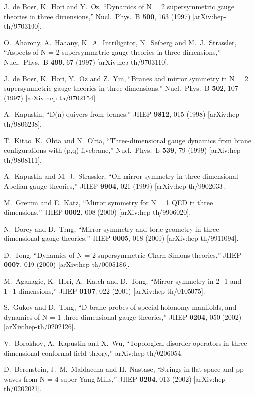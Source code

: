 \documentclass[a4paper,12pt, amsfonts, amssymb]{article}
\begin{document}
\begin{thebibliography}{99}
J.~de Boer, K.~Hori and Y.~Oz,
``Dynamics of N = 2 supersymmetric gauge theories in three dimensions,''
Nucl.\ Phys.\ B {\bf 500}, 163 (1997)
[arXiv:hep-th/9703100].

O.~Aharony, A.~Hanany, K.~A.~Intriligator, N.~Seiberg and M.~J.~Strassler,
``Aspects of N = 2 supersymmetric gauge theories in three dimensions,''
Nucl.\ Phys.\ B {\bf 499}, 67 (1997) [arXiv:hep-th/9703110].

J.~de Boer, K.~Hori, Y.~Oz and Z.~Yin,
``Branes and mirror symmetry in N = 2 supersymmetric gauge theories in  three dimensions,''
Nucl.\ Phys.\ B {\bf 502}, 107 (1997)
[arXiv:hep-th/9702154].

A.~Kapustin, ``D(n) quivers from branes,''
JHEP {\bf 9812}, 015 (1998) [arXiv:hep-th/9806238].

T.~Kitao, K.~Ohta and N.~Ohta,
``Three-dimensional gauge dynamics from brane configurations with  (p,q)-fivebrane,''
Nucl.\ Phys.\ B {\bf 539}, 79 (1999)
[arXiv:hep-th/9808111].

A.~Kapustin and M.~J.~Strassler,
``On mirror symmetry in three dimensional Abelian gauge theories,''
JHEP {\bf 9904}, 021 (1999) [arXiv:hep-th/9902033].

M.~Gremm and E.~Katz, ``Mirror symmetry for N = 1 QED in three dimensions,''
JHEP {\bf 0002}, 008 (2000) [arXiv:hep-th/9906020].

N.~Dorey and D.~Tong, ``Mirror symmetry and toric geometry in three dimensional gauge theories,'' JHEP {\bf 0005}, 018 (2000) [arXiv:hep-th/9911094].

D.~Tong, ``Dynamics of N = 2 supersymmetric Chern-Simons theories,''
JHEP {\bf 0007}, 019 (2000) [arXiv:hep-th/0005186].

M.~Aganagic, K.~Hori, A.~Karch and D.~Tong,
``Mirror symmetry in 2+1 and 1+1 dimensions,''
JHEP {\bf 0107}, 022 (2001) [arXiv:hep-th/0105075].

S.~Gukov and D.~Tong, ``D-brane probes of special holonomy manifolds, and dynamics of N = 1  three-dimensional gauge theories,''
JHEP {\bf 0204}, 050 (2002) [arXiv:hep-th/0202126].

V.~Borokhov, A.~Kapustin and X.~Wu,
``Topological disorder operators in three-dimensional conformal field 
theory,'' arXiv:hep-th/0206054.

D.~Berenstein, J.~M.~Maldacena and H.~Nastase,
``Strings in flat space and pp waves from N = 4 super Yang Mills,''
JHEP {\bf 0204}, 013 (2002) [arXiv:hep-th/0202021].


\end{thebibliography}
\end{document}
